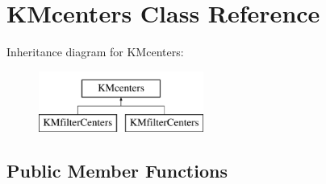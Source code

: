 \hypertarget{class_k_mcenters}{
\section{KMcenters Class Reference}
\label{class_k_mcenters}
}
Inheritance diagram for KMcenters:\begin{figure}[H]
\begin{center}
\leavevmode
\includegraphics[height=2cm]{class_k_mcenters}
\end{center}
\end{figure}
\subsection*{Public Member Functions}
